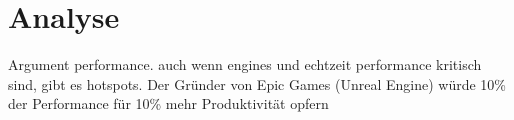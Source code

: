 \chapter{Analyse}
\label{chap:analyse}
Argument performance. auch wenn engines und echtzeit performance kritisch sind, gibt es hotspots.
Der Gründer von Epic Games (Unreal Engine) würde 10\% der Performance für 10\% mehr Produktivität opfern \parencite[Seite 20]{Sweeney2006} %

